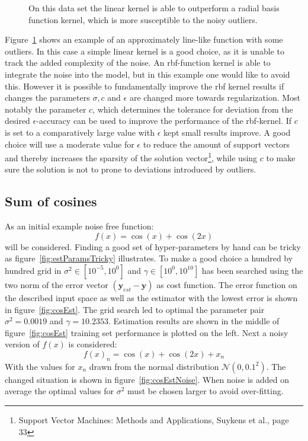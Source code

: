 \begin{figure}
\centering


\caption{On this data set the linear kernel is able to outperform a radial basis function kernel, which is more susceptible to the noisy outliers.}
\label{fig:linearKing}
\end{figure}
Figure~\ref{fig:linearKing} shows an example of an approximately line-like function with some outliers. In this case a simple linear kernel is a good choice, as it is unable to track the added complexity of the noise. An rbf-function kernel is able to integrate the noise into the model, but in this example one would like to avoid this. However it is possible to fundamentally improve the rbf kernel results if changes the parameters $\sigma, c$ and $\epsilon$ are changed more towards regularization. Most notably the parameter $c$, which determines the tolerance for deviation from the desired $\epsilon$-accuracy can be used to improve the performance of the rbf-kernel. If $c$ is set to a comparatively large value with $\epsilon$ kept small results improve. A good choice will use a moderate value for $\epsilon$ to reduce the amount of support vectors and thereby increases the sparsity of the solution vector\footnote{Support Vector Machines: Methods and Applications, Suykens et al., page 33}, while using $c$ to make sure the solution is not to prone to deviations introduced by outliers.
 
\subsection{Sum of cosines}
As an initial example noise free function:
\begin{equation}
f(x) = \cos(x) + \cos(2x)
\end{equation}
will be considered. Finding a good set of hyper-parameters by hand can be tricky as figure~\ref{fig:estParamsTricky} illustrates. To make a good choice a hundred by hundred grid in $\sigma^2 \in [10^{-5},10^{0}]$ and $\gamma \in [10^{0},10^{10}]$  has been searched using the two norm of the error vector $(\mathbf{y}_{est} - \mathbf{y})$ as cost function. The error function on the described input space as well as the estimator with the lowest error is shown in figure~\ref{fig:cosEst}. The grid search led to optimal the parameter pair $\sigma^2 = 0.0019$ and $\gamma = 10.2353$. Estimation results are shown in the middle of figure~\ref{fig:cosEst} training set performance is plotted on the left.
Next a noisy version of $f(x)$ is considered:
\begin{equation}
f(x)_n = \cos(x) + \cos(2x) + x_n
\end{equation}
With the values for $x_n$ drawn from the normal distribution $\mathcal{N}(0,0.1^2)$. The changed situation is shown in figure~\ref{fig:cosEstNoise}. When noise is added on average the optimal values for $\sigma^2$ must be chosen larger to avoid 
over-fitting.

